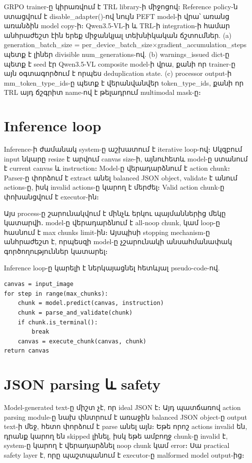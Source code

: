 \documentclass[12pt,a4paper]{report}
\newcommand{\Eng}[1]{\textenglish{#1}}
\begin{document}
GRPO trainer-ը կիրառվում է \Eng{TRL} library-ի միջոցով։ Reference policy-ն ստացվում է \Eng{disable\_adapter()}-ով նույն PEFT model-ի վրա՝ առանց առանձին model copy-ի։ \Eng{Qwen3.5-VL}-ի և \Eng{TRL}-ի integration-ի համար անհրաժեշտ էին երեք միջանկյալ տեխնիկական ճշտումներ. \Eng{(a)} \Eng{generation\_batch\_size} = \Eng{per\_device\_batch\_size}$\times$\Eng{gradient\_accumulation\_steps} պետք է լիներ divisible \Eng{num\_generations}-ով. \Eng{(b)} \Eng{warnings\_issued} dict-ը պետք է seed էր Qwen3.5-VL composite model-ի վրա, քանի որ trainer-ը այն օգտագործում է որպես deduplication state. \Eng{(c)} processor output-ի \Eng{mm\_token\_type\_ids}-ը պետք է վերանվանվեր \Eng{token\_type\_ids}, քանի որ TRL այդ ճշգրիտ name-ով է թելադրում multimodal mask-ը։

\section{Inference loop}

Inference-ի ժամանակ system-ը աշխատում է iterative loop-ով։ Սկզբում input նկարը resize է արվում canvas size-ի, այնուհետև model-ը ստանում է current canvas և instruction։ Model-ը վերադարձնում է action chunk։ Parser-ը փորձում է extract անել balanced JSON object, validate է անում actions-ը, իսկ invalid actions-ը կարող է մերժել։ Valid action chunk-ը փոխանցվում է executor-ին։

Այս process-ը շարունակվում է մինչև երկու պայմաններից մեկը կատարվի․ model-ը վերադարձնում է all-noop chunk, կամ loop-ը հասնում է max chunks limit-ին։ Այսպիսի stopping mechanism-ը անհրաժեշտ է, որպեսզի model-ը չշարունակի անսահմանափակ գործողություններ կատարել։

Inference loop-ը կարելի է ներկայացնել հետևյալ pseudo-code-ով.

\begin{lstlisting}[style=code]
canvas = input_image
for step in range(max_chunks):
    chunk = model.predict(canvas, instruction)
    chunk = parse_and_validate(chunk)
    if chunk.is_terminal():
        break
    canvas = execute_chunk(canvas, chunk)
return canvas
\end{lstlisting}

\section{JSON parsing և safety}

Model-generated text-ը միշտ չէ, որ ideal JSON է։ Այդ պատճառով action parsing module-ը նախ փնտրում է առաջին balanced JSON object-ը output text-ի մեջ, հետո փորձում է parse անել այն։ Եթե որոշ actions invalid են, դրանք կարող են skipped լինել, իսկ եթե ամբողջ chunk-ը invalid է, system-ը կարող է վերադարձնել noop chunk կամ error։ Սա practical safety layer է, որը պաշտպանում է executor-ը malformed model output-ից։
\end{document}
